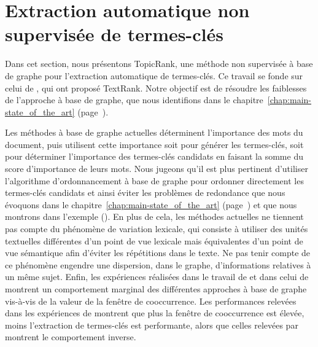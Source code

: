   \section{Extraction automatique non supervisée de termes-clés}
  \label{sec:main-automatic_keyphrase_annotation-unsupervised_automatic_keyphrase_extraction}
    Dans cet section, nous présentons TopicRank, une méthode non supervisée à
    base de graphe pour l'extraction automatique de termes-clés. Ce travail se
    fonde sur celui de , qui ont proposé TextRank.
    Notre objectif est de résoudre les faiblesses de l'approche à base de
    graphe, que nous identifions dans le
    chapitre~\ref{chap:main-state_of_the_art}
    (page~\pageref{chap:main-state_of_the_art}).

    Les méthodes à base de graphe actuelles déterminent l'importance des mots du
    document, puis utilisent cette importance soit pour générer les termes-clés,
    soit pour déterminer l'importance des termes-clés candidats en faisant la
    somme du score d'importance de leurs mots. Nous jugeons qu'il est plus
    pertinent d'utiliser l'algorithme d'ordonnancement à base de graphe pour
    ordonner directement les termes-clés candidats et ainsi éviter les problèmes
    de redondance que nous évoquons dans le
    chapitre~\ref{chap:main-state_of_the_art}
    (page~\pageref{chap:main-state_of_the_art}) et que nous montrons dans
    l'exemple 
    (). En plus de cela, les méthodes actuelles ne tiennent pas
    compte du phénomène de variation lexicale, qui consiste à utiliser des
    unités textuelles différentes d'un point de vue lexicale mais équivalentes
    d'un point de vue sémantique afin d'éviter les répétitions dans le texte. Ne
    pas tenir compte de ce phénomène engendre une dispersion, dans le graphe,
    d'informations relatives à un même sujet. Enfin, les expériences réalisées
    dans le travail de  et dans celui de
     montrent un comportement marginal des
    différentes approches à base de graphe vis-à-vis de la valeur de la fenêtre
    de cooccurrence. Les performances relevées dans les expériences de
     montrent que plus la fenêtre de cooccurrence
    est élevée, moins l'extraction de termes-clés est performante, alors que
    celles relevées par  montrent le comportement
    inverse. 


